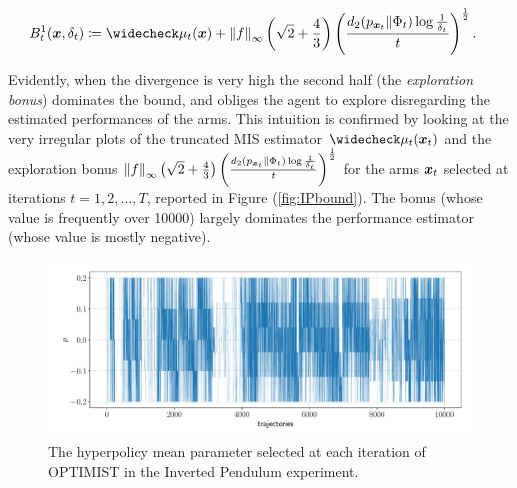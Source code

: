\begin{align}
	&B_t^{1}(\vx,\delta_t) \coloneqq 
	\wc{\mu}_t(\vx)+\norm[\infty]{f}\left(\sqrt{2}+\frac{4}{3}\right)\left(\frac{d_{2}(p_{\vx_t}\|\Phi_{t})\log\frac{1}{\delta_t}}{t}\right)^{\frac{1}{2}}.
\end{align}

Evidently, when the \Renyi divergence is very high the second half (the \emph{exploration bonus}) dominates the bound, and obliges the agent to explore disregarding the estimated performances of the arms. This intuition is confirmed by looking at the very irregular plots of the truncated \gls{MIS} estimator $\wc{\mu}_t(\vx_t)$ and the exploration bonus $\norm[\infty]{f}\left(\sqrt{2}+\frac{4}{3}\right)\left(\frac{d_{2}(p_{\vx_t}\|\Phi_{t})\log\frac{1}{\delta_t}}{t}\right)^{\frac{1}{2}}$ for the arms $\vx_t$ selected at iterations $t=1,2,\dots,T$, reported in Figure (\ref{fig:IPbound}). The bonus (whose value is frequently over 10000) largely dominates the performance estimator (whose value is mostly negative).

\begin{figure}[t!] 
\centering
\includegraphics[width=\textwidth,keepaspectratio]{Images/IP_mu_1.pdf}
\caption{The hyperpolicy mean parameter selected at each iteration of \gls{OPTIMIST} in the Inverted Pendulum experiment.} 
\label{fig:IPmu1}
\end{figure}

